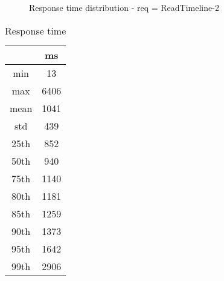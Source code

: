 \begin{minipage}{0.75\linewidth}
\begin{figure}[h]
\begin{adjustbox}{max width=1.0\linewidth, keepaspectratio}
  \end{adjustbox}
  \caption{Response time distribution - req = ReadTimeline-2}
\end{figure}
\end{minipage}\hfill\begin{minipage}{0.18\linewidth}
\begin{table}[h]
\begin{tabular}{|cc|}
\hline
\textbf{} & \textbf{ms}\\ \hline
 \Xhline{0.005\arrayrulewidth}
min & 13\\
 \Xhline{0.005\arrayrulewidth}
max & 6406\\
 \Xhline{0.005\arrayrulewidth}
mean & 1041\\
 \Xhline{0.005\arrayrulewidth}
std & 439\\
\hline
\hline
 \Xhline{0.005\arrayrulewidth}
25th & 852\\
 \Xhline{0.005\arrayrulewidth}
50th & 940\\
 \Xhline{0.005\arrayrulewidth}
75th & 1140\\
 \Xhline{0.005\arrayrulewidth}
80th & 1181\\
 \Xhline{0.005\arrayrulewidth}
85th & 1259\\
 \Xhline{0.005\arrayrulewidth}
90th & 1373\\
 \Xhline{0.005\arrayrulewidth}
95th & 1642\\
 \Xhline{0.005\arrayrulewidth}
99th & 2906\\
\hline
\end{tabular}
\caption{Response time}
\end{table}
\end{minipage}\hfill